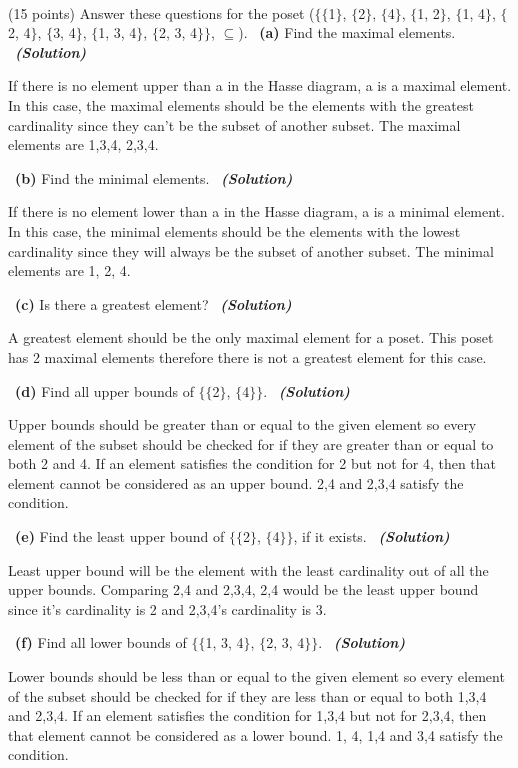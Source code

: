 \documentclass[a4 paper]{article}
\numberwithin{equation}{section}
\newcommand{\problem}[2]{~\\\fbox{\textbf{Problem #1}}\hfill (#2 points)\newline\newline}
\newcommand{\subproblem}[1]{~\newline\textbf{(#1)}}
\newcommand{\solution}{~\newline\textbf{\textit{(Solution)}} }
\newcommand{\0}{\mathbf{0}}
\begin{document}
\problem{2: Relations}{15}
Answer these questions for the poset ($\{\{$1$\}$, $\{$2$\}$, $\{$4$\}$, $\{$1, 2$\}$, $\{$1, 4$\}$, $\{$2, 4$\}$, $\{$3, 4$\}$, $\{$1, 3, 4$\}$, $\{$2, 3, 4$\}\}$, $\subseteq$).
\subproblem{a} Find the maximal elements.
\solution

If there is no element upper than a in the Hasse diagram, a is a maximal element. In this case, the maximal elements should be the elements with the greatest cardinality since they can't be the subset of another subset. The maximal elements are {1,3,4}, {2,3,4}.

\subproblem{b} Find the minimal elements.
\solution

If there is no element lower than a in the Hasse diagram, a is a minimal element. In this case, the minimal elements should be the elements with the lowest cardinality since they will always be the subset of another subset. The minimal elements are {1}, {2}, {4}.

\subproblem{c} Is there a greatest element?
\solution

A greatest element should be the only maximal element for a poset. This poset has 2 maximal elements therefore there is not a greatest element for this case.

\subproblem{d} Find all upper bounds of $\{\{$2$\}$, $\{$4$\}\}$.
\solution

Upper bounds should be greater than or equal to the given element so every element of the subset should be checked for if they are greater than or equal to both {2} and {4}. If an element satisfies the condition for {2} but not for {4}, then that element cannot be considered as an upper bound. {2,4} and {2,3,4} satisfy the condition.

\subproblem{e} Find the least upper bound of $\{\{$2$\}$, $\{$4$\}\}$, if it exists.
\solution

Least upper bound will be the element with the least cardinality out of all the upper bounds. Comparing {2,4} and {2,3,4}, {2,4} would be the least upper bound since it's cardinality is 2 and {2,3,4}'s cardinality is 3.

\subproblem{f} Find all lower bounds of $\{\{$1, 3, 4$\}$, $\{$2, 3, 4$\}\}$.
\solution

Lower bounds should be less than or equal to the given element so every element of the subset should be checked for if they are less than or equal to both {1,3,4} and {2,3,4}. If an element satisfies the condition for {1,3,4} but not for {2,3,4}, then that element cannot be considered as a lower bound. {1}, {4}, {1,4} and {3,4} satisfy the condition.
\end{document}
